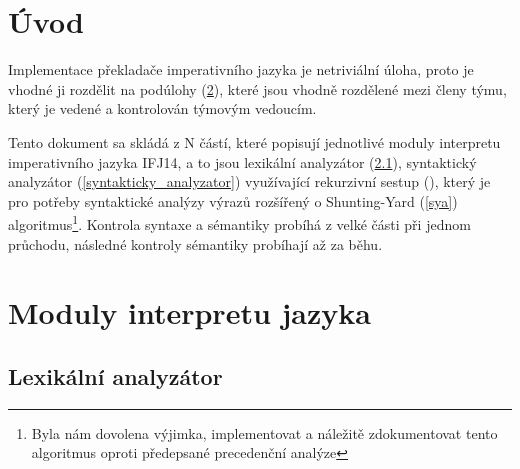 \documentclass[12pt,a4paper,titlepage,final]{article}
\begin{document}

\def\author{xxx}
\def\email{xxx@stud.fit.vutbr.cz}
\def\projname{Implementace interpretu imperativního jazyka IFJ12}



\pagestyle{plain}
\setcounter{page}{1}
\tableofcontents

\newpage
\pagestyle{plain}
\setcounter{page}{1}

\section{Úvod} \label{uvod}
Implementace překladače imperativního jazyka je netriviální úloha, proto je
vhodné ji rozdělit na podúlohy (\ref{moduly_interpretu}), které jsou vhodně
rozdělené mezi členy týmu, který je vedené a kontrolován týmovým vedoucím.

Tento dokument sa skládá z N částí, které popisují jednotlivé moduly
interpretu imperativního jazyka IFJ14, a to jsou lexikální analyzátor
(\ref{lexikalni_analyzator}), syntaktický analyzátor (\ref{syntakticky_analyzator})
využívající rekurzivní sestup (), který je pro potřeby syntaktické
analýzy výrazů rozšířený o Shunting-Yard (\ref{sya}) algoritmus\footnote{Byla nám
dovolena výjimka, implementovat a náležitě zdokumentovat tento algoritmus oproti předepsané
precedenční analýze}. Kontrola syntaxe a sémantiky probíhá z velké části při jednom
průchodu, následné kontroly sémantiky probíhají až za běhu.

\section{Moduly interpretu jazyka} \label{moduly_interpretu}
\subsection{Lexikální analyzátor} \label{lexikalni_analyzator}
\end{document}
